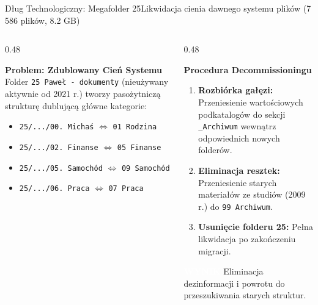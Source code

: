 \documentclass[aspectratio=169, 10pt]{beamer}
\newcommand{\badge}[2]{{\setlength{\fboxsep}{2pt}\colorbox{#1}{\textcolor{white}{\sffamily\bfseries\tiny #2}}}}
\newcommand{\okTag}[1]{{\badge{brandGreen}{#1}}}
\begin{document}
\begin{frame}{Dług Technologiczny: Megafolder 25}{Likwidacja cienia dawnego systemu plików (7\,586 plików, 8.2 GB)}
  \begin{columns}[T]
    \begin{column}{0.48\textwidth}
      \begin{alertblock}{\textbf{Problem: Zdublowany Cień Systemu}}
        Folder \texttt{25 Paweł - dokumenty} (nieużywany aktywnie od 2021 r.) tworzy pasożytniczą strukturę dublującą główne kategorie:
        \begin{itemize}\small
          \item \texttt{25/.../00. Michaś} $\Longleftrightarrow$ \texttt{01 Rodzina}
          \item \texttt{25/.../02. Finanse} $\Longleftrightarrow$ \texttt{05 Finanse}
          \item \texttt{25/.../05. Samochód} $\Longleftrightarrow$ \texttt{09 Samochód}
          \item \texttt{25/.../06. Praca} $\Longleftrightarrow$ \texttt{07 Praca}
        \end{itemize}
      \end{alertblock}
    \end{column}

    \begin{column}{0.48\textwidth}
      \begin{exampleblock}{\textbf{Procedura Decommissioningu}}
        \begin{enumerate}
          \item \textbf{Rozbiórka gałęzi:} Przeniesienie wartościowych podkatalogów do sekcji \texttt{\_Archiwum} wewnątrz odpowiednich nowych folderów.
          \item \textbf{Eliminacja resztek:} Przeniesienie starych materiałów ze studiów (2009 r.) do \texttt{99 Archiwum}.
          \item \textbf{Usunięcie folderu 25:} Pełna likwidacja po zakończeniu migracji.
        \end{enumerate}
      \end{exampleblock}
      
      \vspace{0.2cm}
      \footnotesize \okTag{WYNIK} Eliminacja dezinformacji i powrotu do przeszukiwania starych struktur.
    \end{column}
  \end{columns}
\end{frame}
\end{document}
